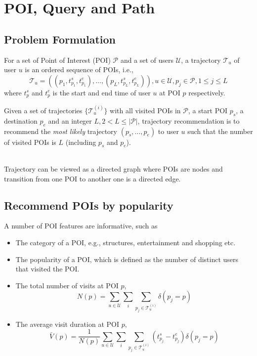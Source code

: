 \section{POI, Query and Path}
\label{method}

\subsection{Problem Formulation}
\label{problem}
For a set of Point of Interest (POI) $\mathcal{P}$ and a set of users $\mathcal{U}$,
a trajectory $\mathcal{T}_u$ of user $u$ is an ordered sequence of POIs,
i.e.,
\begin{displaymath}
    \mathcal{T}_u = ((p_1, t_{p_1}^s, t_{p_{1}}^e), \dots, (p_L, t_{p_L}^s, t_{p_L}^e)),
    u \in \mathcal{U},
    p_j \in \mathcal{P}, 1 \le j \le L
\end{displaymath}
where $t_p^s$ and $t_p^e$ is the start and end time of user $u$ at POI $p$ respectively.

Given a set of trajectories $\{ \mathcal{T}_u^{(i)} \}$ with all visited POIs in $\mathcal{P}$, 
a start POI $p_s$, a destination $p_e$ and an integer $L, 2 < L \le |\mathcal{P}|$,
trajectory recommendation is to recommend the \textit{most likely} trajectory $(p_s, \dots, p_e)$ to 
user $u$ such that the number of visited POIs is $L$ (including $p_s$ and $p_e$).

 \\
Trajectory can be viewed as a directed graph where POIs are nodes and transition from one POI to another one
is a directed edge.

\subsection{Recommend POIs by popularity}
\label{popularity}
%
A number of POI features are informative, such as 
\begin{itemize}
\item The category of a POI, e.g., structures, entertainment and shopping etc.
\item The popularity of a POI, which is defined as the number of distinct users that visited the POI\cite{ht10}.
\item The total number of visits at POI $p$,
      \begin{displaymath}
          N(p) = \sum_{u \in \mathcal{U}} \sum_i \sum_{p_j \in \mathcal{T}_u^{(i)}} \delta(p_j = p)
      \end{displaymath}
\item The average visit duration at POI $p$\cite{ijcai15},
      \begin{displaymath}
          \bar{V}(p) = \frac{1}{N(p)} \sum_{u \in \mathcal{U}} \sum_i \sum_{p_j \in \mathcal{T}_u^{(i)}} 
                       (t_{p_j}^s - t_{p_j}^e) \delta(p_j = p)
      \end{displaymath}
\end{itemize}

